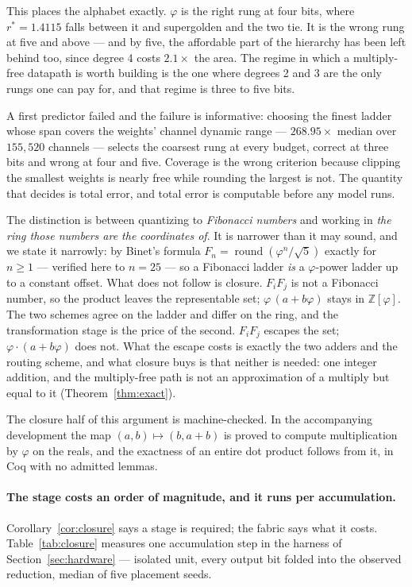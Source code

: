 This places the alphabet exactly. $\varphi$ is the right rung at four bits,
where $r^{*}=1.4115$ falls between it and supergolden and the two tie. It is the
wrong rung at five and above --- and by five, the affordable part of the
hierarchy has been left behind too, since degree 4 costs $2.1\times$ the area.
The regime in which a multiply-free datapath is worth building is the one where
degrees 2 and 3 are the only rungs one can pay for, and that regime is three to
five bits.

A first predictor failed and the failure is informative: choosing the finest
ladder whose span covers the weights' channel dynamic range --- $268.95\times$
median over $155{,}520$ channels --- selects the coarsest rung at every budget,
correct at three bits and wrong at four and five. Coverage is the wrong
criterion because clipping the smallest weights is nearly free while rounding
the largest is not. The quantity that decides is total error, and total error is
computable before any model runs.

The distinction is between quantizing to \emph{Fibonacci numbers} and working in
\emph{the ring those numbers are the coordinates of}. It is narrower than it may
sound, and we state it narrowly: by Binet's formula $F_n = \operatorname{round}
(\varphi^{n}/\sqrt5)$ exactly for $n \ge 1$ --- verified here to $n = 25$ --- so a
Fibonacci ladder \emph{is} a $\varphi$-power ladder up to a constant offset. What
does not follow is closure. $F_iF_j$ is not a Fibonacci number, so the product
leaves the representable set; $\varphi\,(a+b\varphi)$ stays in
$\mathbb{Z}[\varphi]$. The two schemes agree on the ladder and differ on the
ring, and the transformation stage is the price of the second. $F_iF_j$ escapes the set;
$\varphi\cdot(a+b\varphi)$ does not. What the escape costs is exactly the two
adders and the routing scheme, and what closure buys is that neither is needed:
one integer addition, and the multiply-free path is not an approximation of a
multiply but equal to it (Theorem~\ref{thm:exact}).

The closure half of this argument is machine-checked. In the accompanying
development the map $(a,b)\mapsto(b,a+b)$ is proved to compute multiplication by
$\varphi$ on the reals, and the exactness of an entire dot product follows from
it, in Coq with no admitted lemmas.

\paragraph{The stage costs an order of magnitude, and it runs per accumulation.}
Corollary~\ref{cor:closure} says a stage is required; the fabric says what it
costs. Table~\ref{tab:closure} measures one accumulation step in the harness of
Section~\ref{sec:hardware} --- isolated unit, every output bit folded into the
observed reduction, median of five placement seeds.

